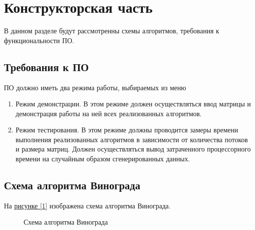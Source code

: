 \documentclass{article}
\begin{document}
	\newpage
	\section{Конструкторская часть}
		В данном разделе будут рассмотренны схемы алгоритмов, требования к функциональности ПО.
		\subsection{Требования к ПО} 
		ПО должно иметь два режима работы, выбираемых из меню
		\begin{enumerate}
			\item Режим демонстрации. В этом режиме должен осуществляться ввод матрицы и демонстрация работы на ней всех реализованных алгоритмов.
		 	\item Режим тестирования. В этом режиме должны проводится замеры времени выполнения реализованных алгоритмов в зависимости от количества потоков и размера матриц. Должен осуществляться вывод затраченного процессорного времени на случайным образом сгенерированных данных.
	 	\end{enumerate}
	 	
	 	\subsection{Схема алгоритма Винограда}
	 	
	На \hyperref[vinogradAlgo]{рисунке  [\ref{vinogradAlgo}]} изображена схема алгоритма Винограда.
	\begin{figure}[h!]
		\caption{Схема алгоритма Винограда}
		\label{vinogradAlgo}
	\end{figure}
	\newpage
\end{document}
